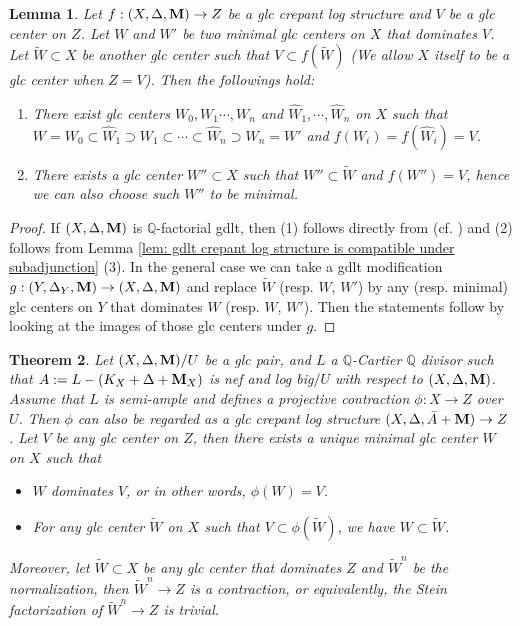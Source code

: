 \documentclass[11pt]{amsart}
\numberwithin{equation}{section}
\newcommand{\Mm}{{\bf{M}}}
\newcommand{\Qq}{\mathbb{Q}}
\newtheorem{thm}{Theorem}[section]
\newtheorem{lem}[thm]{Lemma}
\theoremstyle{definition}
\theoremstyle{definition}
\theoremstyle{definition}
\begin{document}
\begin{lem}\label{lem: connectedness principle and compatibility for glc crepant structure}
Let $f:(X,\Delta,\Mm)\to Z$ be a glc crepant log structure and $V$ be a glc center on $Z$. Let $W$ and $W'$ be two minimal glc centers on $X$ that dominates $V$. Let $\tilde{W}\subset X$ be another glc center such that $V\subset f(\tilde{W})$ (We allow $X$ itself to be a glc center when $Z=V$). Then the followings hold:
\begin{enumerate}
    \item There exist glc centers $W_0,W_1\cdots,W_n$ and $\hat{W}_1,\cdots,\hat{W}_n$ on $X$ such that $W=W_0\subset\hat{W}_1\supset W_1\subset\cdots\subset\hat{W}_n\supset W_n=W'$ and $f(W_i)=f(\hat{W}_i)=V$.
    \item There exists a glc center $W''\subset X$ such that $W''\subset\tilde{W}$ and $f(W'')=V$, hence we can also choose such $W''$ to be minimal.
\end{enumerate}
\end{lem}
\begin{proof}
If $(X,\Delta,\Mm)$ is $\Qq$-factorial gdlt, then (1) follows directly from \cite[Theorem 3.16]{LX22b} (cf. \cite[Theorem 1.4]{FS20}) and (2) follows from Lemma \ref{lem: gdlt crepant log structure is compatible under subadjunction} (3). In the general case we can take a gdlt modification $g:(Y,\Delta_Y,\Mm)\to(X,\Delta,\Mm)$ and replace $\tilde{W}$ (resp. $W$, $W'$) by any (resp. minimal) glc centers on $Y$ that dominates $W$ (resp. $W$, $W'$). Then the statements follow by looking at the images of those glc centers under $g$.
\end{proof}



\begin{thm}\label{thm: unique minimal glc center for log big glc crepant structure}
Let $(X,\Delta,\Mm)/U$ be a glc pair, and $L$ a $\Qq$-Cartier $\Qq$ divisor such that $A:=L-(K_X+\Delta+\Mm_X)$ is nef and log big$/U$ with respect to $(X,\Delta,\Mm)$. Assume that $L$ is semi-ample and defines a projective contraction $\phi: X\to Z$ over $U$. Then $\phi$ can also be regarded as a glc crepant log structure $(X,\Delta,\bar{A}+\Mm)\to Z$. Let $V$ be any glc center on $Z$, then there exists a unique minimal glc center $W$ on $X$ such that
\begin{itemize}
    \item $W$ dominates $V$, or in other words, $\phi(W)=V$.
    \item For any glc center $\tilde{W}$ on $X$ such that $V\subset\phi(\tilde{W})$, we have $W\subset \tilde{W}$.
\end{itemize}
Moreover, let $\tilde{W}\subset X$ be any glc center that dominates $Z$ and $\tilde{W}^n$ be the normalization, then $\tilde{W}^n\to Z$ is a contraction, or equivalently, the Stein factorization of $\tilde{W}^n\to Z$ is trivial.
\end{thm}
\end{document}
